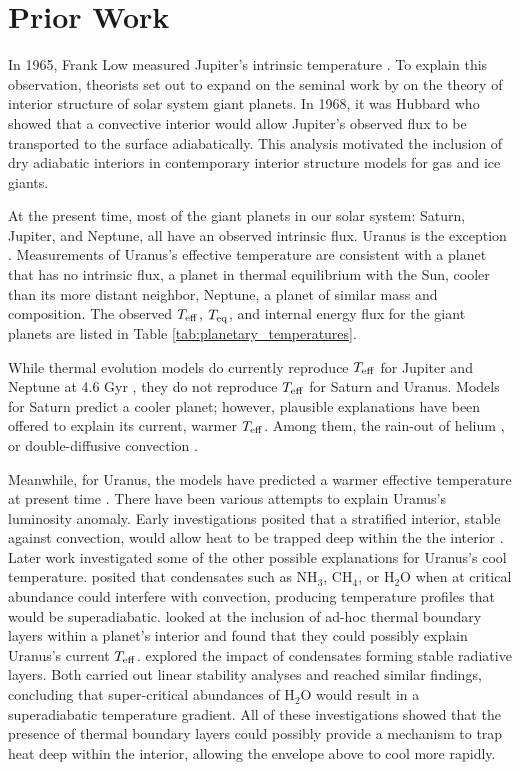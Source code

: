 \documentclass[11pt]{ucscthesisbs}
\begin{document}
\section{Prior Work}
In 1965, Frank Low measured Jupiter's intrinsic temperature \citep{low_1966}. To explain this observation, theorists \citep{hubbard_1968, smoluchowski_1967,hubbard_1977, hubbard_1977_2, podolak_1991} set out to expand on the seminal work by \citep{demarcus_1958} on the theory of interior structure of solar system giant planets. In 1968, it was Hubbard who showed that a convective interior would allow Jupiter's observed flux to be transported to the surface adiabatically. This analysis motivated the inclusion of dry adiabatic interiors in contemporary interior structure models for gas and ice giants.

At the present time, most of the giant planets in our solar system: Saturn, Jupiter, and Neptune, all have an observed intrinsic flux. Uranus is the exception \citep{pearl_conrath_1991}. Measurements of Uranus's effective temperature are consistent with a planet that has no intrinsic flux, a planet in thermal equilibrium with the Sun, cooler than its more distant neighbor, Neptune, a planet of similar mass and composition. The observed $T_{\rm eff}$, $T_{\rm eq}$, and internal energy flux for the giant planets are listed in Table \ref{tab:planetary_temperatures}. 

While thermal evolution models do currently reproduce $T_{\rm eff}$ for Jupiter and Neptune at 4.6 Gyr \citep{graboske_1975,fortney_2011}, they do not reproduce $T_{\rm eff}$ for Saturn and Uranus. Models for Saturn predict a cooler planet; however, plausible explanations have been offered to explain its current, warmer $T_{\rm eff}$. Among them, the rain-out of helium \citep{fortney_hubbard_2003, mankovich_2020}, or double-diffusive convection \citep{leconte_chabrier_2013}. 

Meanwhile, for Uranus, the models have predicted a warmer effective temperature at present time \citep{fortney_2011, podolak_1991, hubbard_1995, scheibe_2019}. There have been various attempts to explain Uranus's luminosity anomaly. Early investigations posited that a stratified interior, stable against convection, would allow heat to be trapped deep within the the interior \citep{podolak_1991}. Later work investigated some of the other possible explanations for Uranus's cool temperature. \citep{guillot_1995} posited that condensates such as NH$_{3}$, CH$_{4}$, or H$_{2}$O when at critical abundance could interfere with convection, producing temperature profiles that would be superadiabatic. \citep{nettelmann_2016} looked at the inclusion of ad-hoc thermal boundary layers within a planet's interior and found that they could possibly explain Uranus's current $T_{\rm eff}$. \citep{friedson_2017,leconte_2017} explored the impact of condensates forming stable radiative layers. Both carried out linear stability analyses and reached similar findings, concluding that super-critical abundances of H$_{2}$O would result in a superadiabatic temperature gradient. All of these investigations showed that the presence of thermal boundary layers could possibly provide a mechanism to trap heat deep within the interior, allowing the envelope above to cool more rapidly.
\end{document}
